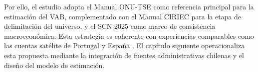 Por ello, el estudio adopta el Manual ONU-TSE como referencia principal para la estimación 
del VAB, complementado con el Manual CIRIEC para la etapa de delimitación del universo, y 
el SCN 2025 como marco de consistencia macroeconómica. Esta estrategia es coherente con 
experiencias comparables como las cuentas satélite de Portugal  y 
España \cite{noauthor_cuenta_2006}. El capítulo siguiente operacionaliza esta propuesta mediante 
la integración de fuentes administrativas chilenas y el diseño del modelo de estimación.